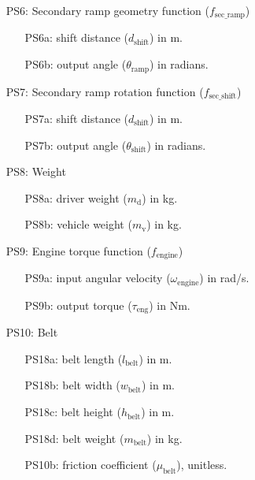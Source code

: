 \documentclass[12pt]{article}
\begin{document}
\begin{itemize}
\item[PS6:] Secondary ramp geometry function ($f_{\text{sec\_ramp}}$)

\begin{itemize}
  \item [PS6a:] shift distance ($d_{\text{shift}}$) in m.
  \item [PS6b:] output angle ($\theta_{\text{ramp}}$) in radians.
\end{itemize}

\item[PS7:] Secondary ramp rotation function ($f_{\text{sec\_shift}}$)

\begin{itemize}
  \item [PS7a:] shift distance ($d_{\text{shift}}$) in m.
  \item [PS7b:] output angle ($\theta_{\text{shift}}$) in radians.
\end{itemize}

\item[PS8:] Weight

\begin{itemize}
  \item [PS8a:] driver weight ($m_{\text{d}}$) in kg.
  \item [PS8b:] vehicle weight ($m_{\text{v}}$) in kg.
\end{itemize}

\item[PS9:] Engine torque function ($f_{\text{engine}}$)

\begin{itemize}
  \item [PS9a:] input angular velocity ($\omega_{\text{engine}}$) in rad/s.
  \item [PS9b:] output torque ($\tau_{\text{eng}}$) in Nm.
\end{itemize}

\item[PS10:] Belt

\begin{itemize}
  \item [PS18a:] belt length ($l_{\text{belt}}$) in m.
  \item [PS18b:] belt width ($w_{\text{belt}}$) in m.
  \item [PS18c:] belt height ($h_{\text{belt}}$) in m.
  \item [PS18d:] belt weight ($m_{\text{belt}}$) in kg.
  \item [PS10b:] friction coefficient ($\mu_{\text{belt}}$), unitless.
\end{itemize}


\end{itemize}
\end{document}
